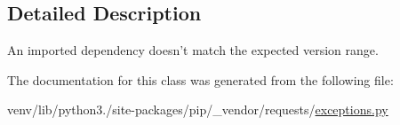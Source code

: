 \subsection{Detailed Description}
\begin{DoxyVerb}An imported dependency doesn't match the expected version range.\end{DoxyVerb}
 

The documentation for this class was generated from the following file\+:\begin{DoxyCompactItemize}
\item 
venv/lib/python3./site-\/packages/pip/\+\_\+vendor/requests/\hyperlink{pip_2__vendor_2requests_2exceptions_8py}{exceptions.\+py}\end{DoxyCompactItemize}
